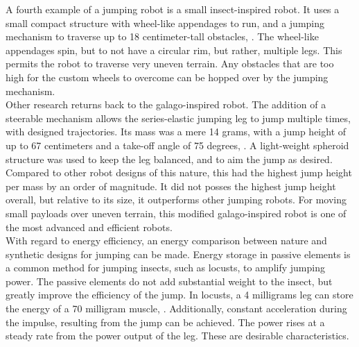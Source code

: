 \indent A fourth example of a jumping robot is a small insect-inspired robot. It uses a small compact structure with wheel-like appendages to run, and a jumping mechanism to traverse up to 18 centimeter-tall obstacles, \cite{lambrecht_small_2005}. The wheel-like appendages spin, but to not have a circular rim, but rather, multiple legs. This permits the robot to traverse very uneven terrain. Any obstacles that are too high for the custom wheels to overcome can be hopped over by the jumping mechanism. \\

\indent Other research returns back to the galago-inspired robot. The addition of a steerable mechanism allows the series-elastic jumping leg to jump multiple times, with designed trajectories. Its mass was a mere 14 grams, with a jump height of up to 67 centimeters and a take-off angle of 75 degrees, \cite{kovac_steerable_2010}. A light-weight spheroid structure was used to keep the leg balanced, and to aim the jump as desired. Compared to other robot designs of this nature, this had the highest jump height per mass by an order of magnitude. It did not posses the highest jump height overall, but relative to its size, it outperforms other jumping robots. For moving small payloads over uneven terrain, this modified galago-inspired robot is one of the most advanced and efficient robots.\\

\indent With regard to energy efficiency, an energy comparison between nature and synthetic designs for jumping can be made. Energy storage in passive elements is a common method for jumping insects, such as locusts, to amplify jumping power. The passive elements do not add substantial weight to the insect, but greatly improve the efficiency of the jump. In locusts, a 4 milligrams leg can store the energy of a 70 milligram muscle, \cite{bennet-clark_energetics_nodate}. Additionally, constant acceleration during the impulse, resulting from the jump can be achieved. The power rises at a steady rate from the power output of the leg. These are desirable characteristics. \\
